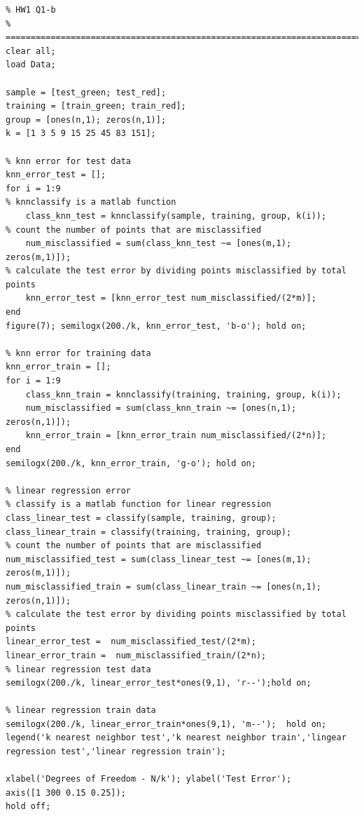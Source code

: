 \documentclass[pra,groupedaddress,amsmath,amssymb, column]{revtex4}
\begin{document}
\begin{verbatim}
% HW1 Q1-b
% =========================================================================
clear all;
load Data;

sample = [test_green; test_red];
training = [train_green; train_red];
group = [ones(n,1); zeros(n,1)];
k = [1 3 5 9 15 25 45 83 151];

% knn error for test data
knn_error_test = [];
for i = 1:9
% knnclassify is a matlab function
    class_knn_test = knnclassify(sample, training, group, k(i)); 
% count the number of points that are misclassified
    num_misclassified = sum(class_knn_test ~= [ones(m,1); zeros(m,1)]);
% calculate the test error by dividing points misclassified by total points 
    knn_error_test = [knn_error_test num_misclassified/(2*m)];  
end
figure(7); semilogx(200./k, knn_error_test, 'b-o'); hold on;

% knn error for training data
knn_error_train = [];
for i = 1:9
    class_knn_train = knnclassify(training, training, group, k(i));
    num_misclassified = sum(class_knn_train ~= [ones(n,1); zeros(n,1)]);
    knn_error_train = [knn_error_train num_misclassified/(2*n)]; 
end
semilogx(200./k, knn_error_train, 'g-o'); hold on;

% linear regression error
% classify is a matlab function for linear regression
class_linear_test = classify(sample, training, group); 
class_linear_train = classify(training, training, group);
% count the number of points that are misclassified
num_misclassified_test = sum(class_linear_test ~= [ones(m,1); zeros(m,1)]); 
num_misclassified_train = sum(class_linear_train ~= [ones(n,1); zeros(n,1)]);
% calculate the test error by dividing points misclassified by total points
linear_error_test =  num_misclassified_test/(2*m); 
linear_error_train =  num_misclassified_train/(2*n); 
% linear regression test data
semilogx(200./k, linear_error_test*ones(9,1), 'r--');hold on;

% linear regression train data
semilogx(200./k, linear_error_train*ones(9,1), 'm--');  hold on;
legend('k nearest neighbor test','k nearest neighbor train','lingear regression test','linear regression train');

xlabel('Degrees of Freedom - N/k'); ylabel('Test Error');
axis([1 300 0.15 0.25]);
hold off;
\end{verbatim}
\end{document}
